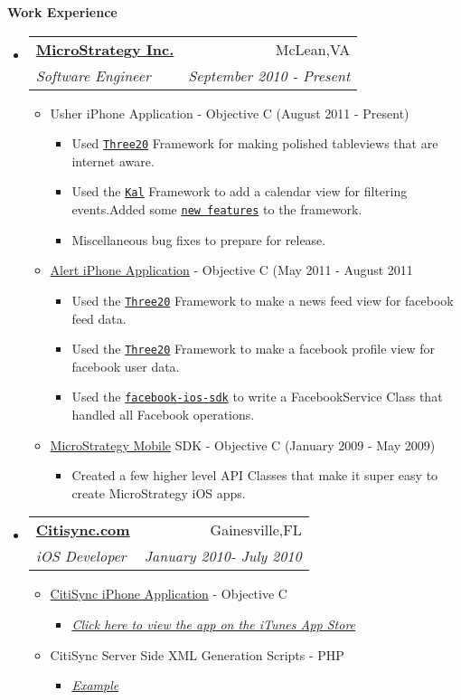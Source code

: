 \documentclass[letterpaper,11pt]{article}
\makeatletter
\newcommand{\resitem}[1]{\item #1 \vspace{-2pt}}
\newcommand{\resheading}[1]{{\large \colorbox{mygrey}{\begin{minipage}{\textwidth}{\textbf{#1 \vphantom{p\^{E}}}}\end{minipage}}}}
\newcommand{\ressubheading}[4]{
\begin{tabular*}{7.0in}{l@{\extracolsep{\fill}}r}
		\textbf{#1} & #2 \\
		\textit{#3} & \textit{#4} \\
\end{tabular*}\vspace{-6pt}}
\makeatother
\begin{document}
\resheading{Work Experience}
\begin{itemize}
\item
    \ressubheading{\href{http://www.microstrategy.com/Company}{MicroStrategy Inc.}}{McLean,VA}{Software Engineer}{September 2010 - Present}
    \begin{itemize}
        \resitem{Usher iPhone Application - Objective C (August 2011 - Present)}
        \begin{itemize}
            \resitem{Used \href{http://github.com/facebook/three20}{\texttt{Three20}} Framework for making polished tableviews that are internet aware.}
            \resitem{Used the \href{http://github.com/klazuka/Kal}{\texttt{Kal}} Framework to add a calendar view for filtering events.Added some \href{https://github.com/samyzee/Kal/commits/master}{\texttt{new features}} to the framework.}
            \resitem{Miscellaneous bug fixes to prepare for release.}
        \end{itemize}
        \resitem{\href{http://itunes.apple.com/us/app/alert-for-iphone/id442981988?mt=8&ls=1}{Alert iPhone Application} - Objective C (May 2011 - August 2011}
        \begin{itemize}
            \resitem{Used the \href{http://github.com/facebook/three20}{\texttt{Three20}} Framework to make a news feed view for facebook feed data.}
            \resitem{Used the \href{http://github.com/facebook/three20}{\texttt{Three20}} Framework to make a facebook profile view for facebook user data.}
        	   \resitem{Used the \href{https://github.com/facebook/facebook-ios-sdk}{\texttt{facebook-ios-sdk}} to write a FacebookService Class that handled all Facebook operations.}
        \end{itemize}
        \resitem{ \href{http://www.microstrategy.com/mobile/}{MicroStrategy Mobile} SDK - Objective C (January 2009 - May 2009)}
        \begin{itemize}
            \resitem{Created a few higher level API Classes that make it super easy to create MicroStrategy iOS apps.}
        \end{itemize}
    \end{itemize}

\item
    \ressubheading{\href{http://citisync.com}{Citisync.com}}{Gainesville,FL}{iOS Developer}{January 2010- July 2010}
    \begin{itemize}
        \resitem{\href{http://citisync.com/iphone}{CitiSync iPhone Application} - Objective C}
        \begin{itemize}
            \resitem{\href{http://itunes.apple.com/us/app/citisync/id387136606?mt=8}{\emph{Click here to view the app on the iTunes App Store}}}
        \end{itemize}
        \resitem{CitiSync Server Side XML Generation Scripts - PHP}
        \begin{itemize}
        	   \resitem{\href{http://citisync.com/iphone_happening}{\emph{Example}}}
        \end{itemize}
    \end{itemize}


\end{itemize}
\end{document}
